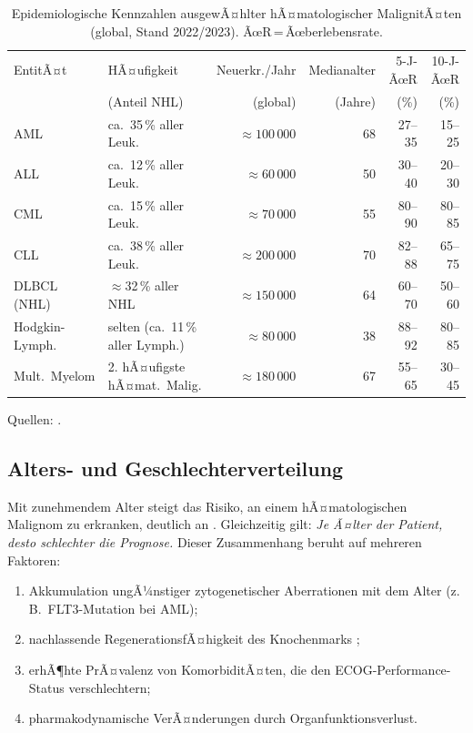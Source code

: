 ﻿\documentclass[12pt,a4paper]{article}
\theoremstyle{definition}
\begin{document}
\begin{table}
\centering
\caption{Epidemiologische Kennzahlen ausgewÃ¤hlter hÃ¤matologischer MalignitÃ¤ten
  (global, Stand 2022/2023). ÃœR\,=\,Ãœberlebensrate.}
\label{tab:epidemiologie}
\begin{tabular}{@{}llrrrr@{}}
\toprule
EntitÃ¤t & HÃ¤ufigkeit & Neuerkr./Jahr & Medianalter & 5-J-ÃœR & 10-J-ÃœR \\
        & (Anteil NHL) & (global) & (Jahre) & (\%) & (\%) \\
\midrule
AML           & ca.\ 35\,\% aller Leuk. & $\approx 100\,000$ & 68 & 27--35 & 15--25 \\
ALL           & ca.\ 12\,\% aller Leuk. & $\approx 60\,000$  & 50 & 30--40 & 20--30 \\
CML           & ca.\ 15\,\% aller Leuk. & $\approx 70\,000$  & 55 & 80--90 & 80--85 \\
CLL           & ca.\ 38\,\% aller Leuk. & $\approx 200\,000$ & 70 & 82--88 & 65--75 \\
DLBCL (NHL)   & $\approx$32\,\% aller NHL & $\approx 150\,000$ & 64 & 60--70 & 50--60 \\
Hodgkin-Lymph.& selten (ca.\ 11\,\% aller Lymph.) & $\approx 80\,000$ & 38 & 88--92 & 80--85 \\
Mult.\ Myelom & 2. hÃ¤ufigste hÃ¤mat.\ Malig. & $\approx 180\,000$ & 67 & 55--65 & 30--45 \\
\bottomrule
\end{tabular}
\end{table}

\noindent Quellen: \cite{adeyemi2025,siegel2023,bray2018,dohner2017,kumar2017,coiffier2002,hochhaus2017}.

\subsection{Alters- und Geschlechterverteilung}

Mit zunehmendem Alter steigt das Risiko, an einem hÃ¤matologischen Malignom zu
erkranken, deutlich an \cite{deschler2006}. Gleichzeitig gilt: \emph{Je Ã¤lter der
Patient, desto schlechter die Prognose.} Dieser Zusammenhang beruht auf mehreren
Faktoren:
\begin{enumerate}
  \item Akkumulation ungÃ¼nstiger zytogenetischer Aberrationen mit dem Alter
        (z.\,B.\ FLT3-Mutation bei AML);
  \item nachlassende RegenerationsfÃ¤higkeit des Knochenmarks \cite{appelbaum2006};
  \item erhÃ¶hte PrÃ¤valenz von KomorbiditÃ¤ten, die den ECOG-Performance-Status
        \cite{oken1982} verschlechtern;
  \item pharmakodynamische VerÃ¤nderungen durch Organfunktionsverlust.
\end{enumerate}
\end{document}
